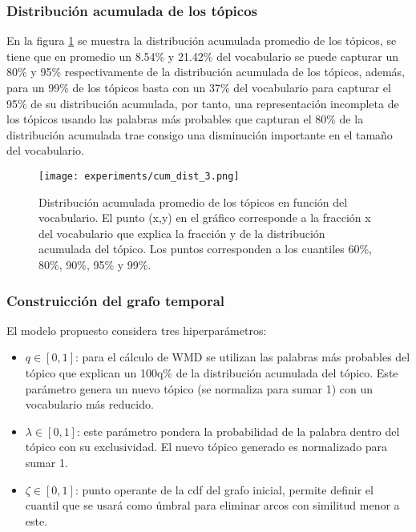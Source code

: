 \documentclass[letterpaper,12pt,oneside]{book} %
\begin{document}
\subsubsection{Distribución acumulada de los tópicos}
En la figura \ref{img:cum_dist3} se muestra la distribución acumulada promedio de los tópicos, se tiene que en promedio un 8.54\% y 21.42\% del vocabulario se puede capturar un 80\% y 95\% respectivamente de la distribución acumulada de los tópicos, además, para un 99\% de los tópicos basta con un 37\% del vocabulario para capturar el 95\% de su distribución acumulada, por tanto, una representación incompleta de los tópicos usando las palabras más probables que capturan el 80\% de la distribución acumulada trae consigo una disminución importante en el tamaño del vocabulario. 


\begin{figure}
    \centering
    \texttt{[image: experiments/cum\_dist\_3.png]}
    \caption{Distribución acumulada promedio de los tópicos en función del vocabulario. El punto (x,y) en el gráfico corresponde a la fracción x del vocabulario que explica la fracción y de la distribución acumulada del tópico. Los puntos corresponden a los cuantiles 60\%, 80\%, 90\%, 95\% y 99\%.}
    \label{img:cum_dist3}
\end{figure}

\subsubsection{Construicción del grafo temporal}

El modelo propuesto considera tres hiperparámetros:
\begin{itemize}
    \item $q \in [0,1]$: para el cálculo de WMD se utilizan las palabras más probables del tópico que explican un 100q\% de la distribución acumulada del tópico. Este parámetro genera un nuevo tópico (se normaliza para sumar 1) con un vocabulario más reducido.
    \item $\lambda \in [0,1]$: este parámetro pondera la probabilidad de la palabra dentro del tópico con su exclusividad. El nuevo tópico generado es normalizado para sumar 1.
    \item $\zeta \in [0,1]$: punto operante de la cdf del grafo inicial, permite definir el cuantil que se usará como úmbral para eliminar arcos con similitud menor a este. 
\end{itemize}
\end{document}
